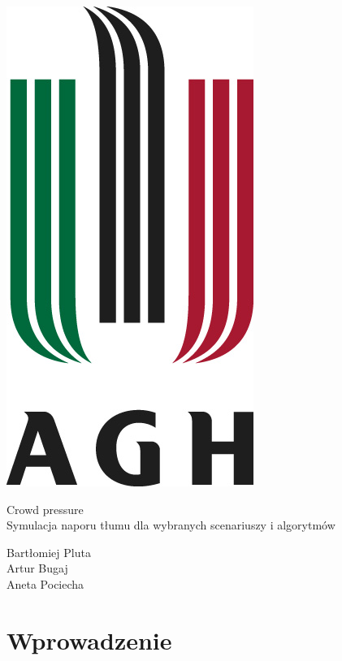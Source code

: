 \documentclass[a4paper,11pt]{article}
\begin{document}
	\begin{titlepage} 
		\begin{center}
			\includegraphics[scale=0.4]{agh.jpg}
		\end{center}
		
		
		\begin{center}
			\fontsize{32pt}{80pt}\selectfont
			\vspace{0.7cm}
			Crowd pressure \\ 
			\fontsize{18pt}{30pt}\selectfont
			Symulacja naporu tłumu dla wybranych scenariuszy i
			algorytmów
			\vspace{0.7cm}
		\end{center}
		
		
		\vfill
		\parbox[t]{0.93\textwidth}{
			\raggedleft
			\large
			{\Large Bartłomiej Pluta}\\[4pt]
			{\Large Artur Bugaj}\\[4pt]
			{\Large Aneta Pociecha}\\[4pt]
	
		}	
	\end{titlepage}

	\newpage
	
	\tableofcontents
	
	\newpage
	
	


	\section{Wprowadzenie}
	
	

\begin{thebibliography}{9}

	
\end{thebibliography}


\end{document}
